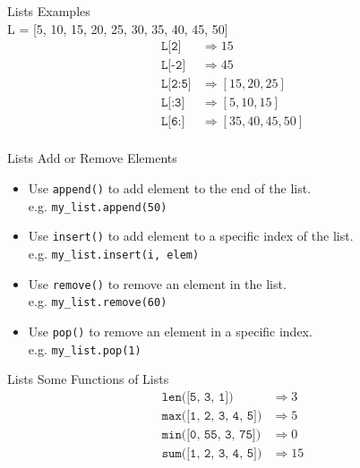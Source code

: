 \documentclass{beamer}
\begin{document}
    \begin{frame}{Lists}
        \color{blue} \Large Examples \\
        \color{black} \normalsize
        L = [5, 10, 15, 20, 25, 30, 35, 40, 45, 50] \\
        \begin{align*}
            \texttt{L[2]} & \Rightarrow 15 \\
            \texttt{L[-2]} & \Rightarrow 45 \\
            \texttt{L[2:5]} & \Rightarrow [15, 20, 25] \\
            \texttt{L[:3]} & \Rightarrow [5, 10, 15] \\
            \texttt{L[6:]} & \Rightarrow [35, 40, 45, 50] \\
        \end{align*}
    \end{frame}
    
    \begin{frame}{Lists}
        \color{blue} \Large Add or Remove Elements \\
        \color{black} \normalsize \vskip 5pt
        \begin{itemize}
            \item Use \texttt{append()} to add element to the end of the list. \\
                  e.g. \texttt{my\_list.append(50)} 
            \item Use \texttt{insert()} to add element to a specific index of the list. \\
                  e.g. \texttt{my\_list.insert(i, elem)}
            \item Use \texttt{remove()} to remove an element in the list. \\
                  e.g. \texttt{my\_list.remove(60)}
            \item Use \texttt{pop()} to remove an element in a specific index. \\
                  e.g. \texttt{my\_list.pop(1)}
        \end{itemize}
        
    \end{frame}
    
    \begin{frame}{Lists}
        \color{blue} \Large Some Functions of Lists \\
        \color{black} \normalsize \vskip 5pt
        \begin{align*}
            \texttt{len([5, 3, 1])} &\Rightarrow 3 \\
            \texttt{max([1, 2, 3, 4, 5])} &\Rightarrow 5 \\
            \texttt{min([0, 55, 3, 75])} &\Rightarrow 0 \\
            \texttt{sum([1, 2, 3, 4, 5])} &\Rightarrow 15 \\
        \end{align*}
    \end{frame}
\end{document}
